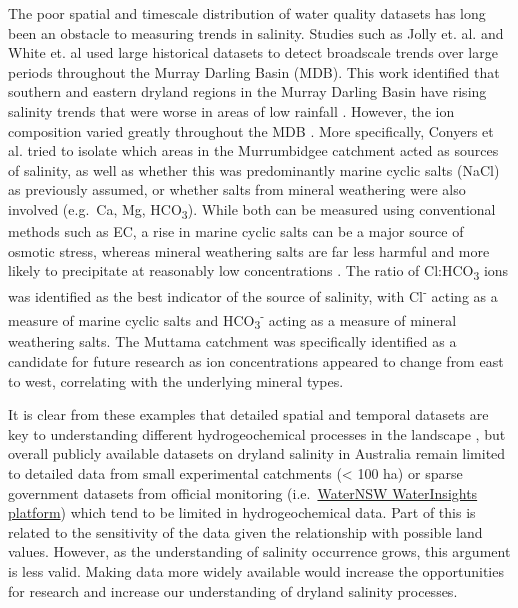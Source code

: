 \documentclass[, manuscript]{copernicus}
\begin{document}
The poor spatial and timescale distribution of water quality datasets
has long been an obstacle to measuring trends in salinity. Studies such
as Jolly et. al. \citeyearpar{Jolly2001} and White et. al
\citeyearpar{White2009} used large historical datasets to detect
broadscale trends over large periods throughout the Murray Darling Basin
(MDB). This work identified that southern and eastern dryland regions in
the Murray Darling Basin have rising salinity trends that were worse in
areas of low rainfall \citep{White2009, Jolly2001}. However, the ion
composition varied greatly throughout the MDB \citep{White2009}. More
specifically, Conyers et al. \citeyearpar{Conyers2008} tried to isolate
which areas in the Murrumbidgee catchment acted as sources of salinity,
as well as whether this was predominantly marine cyclic salts (NaCl) as
previously assumed, or whether salts from mineral weathering were also
involved (e.g.~Ca, Mg, HCO\textsubscript{3}). While both can be measured
using conventional methods such as EC, a rise in marine cyclic salts can
be a major source of osmotic stress, whereas mineral weathering salts
are far less harmful and more likely to precipitate at reasonably low
concentrations \citep{Conyers2008}. The ratio of Cl:HCO\textsubscript{3}
ions was identified as the best indicator of the source of salinity,
with Cl\textsuperscript{-} acting as a measure of marine cyclic salts
and HCO\textsubscript{3}\textsuperscript{-} acting as a measure of
mineral weathering salts. The Muttama catchment was specifically
identified as a candidate for future research as ion concentrations
appeared to change from east to west, correlating with the underlying
mineral types.

It is clear from these examples that detailed spatial and temporal
datasets are key to understanding different hydrogeochemical processes
in the landscape \citep[e.g.][]{Cartwright2010, Dalhaus2010}, but
overall publicly available datasets on dryland salinity in Australia
remain limited to detailed data from small experimental catchments
(\textless{} 100 ha) \citep{Summerell2006, Hughes2007} or sparse
government datasets from official monitoring
(i.e.~\href{https://waterinsights.waternsw.com.au/}{WaterNSW
WaterInsights platform}) which tend to be limited in hydrogeochemical
data. Part of this is related to the sensitivity of the data given the
relationship with possible land values. However, as the understanding of
salinity occurrence grows, this argument is less valid. Making data more
widely available would increase the opportunities for research and
increase our understanding of dryland salinity processes.
\end{document}
